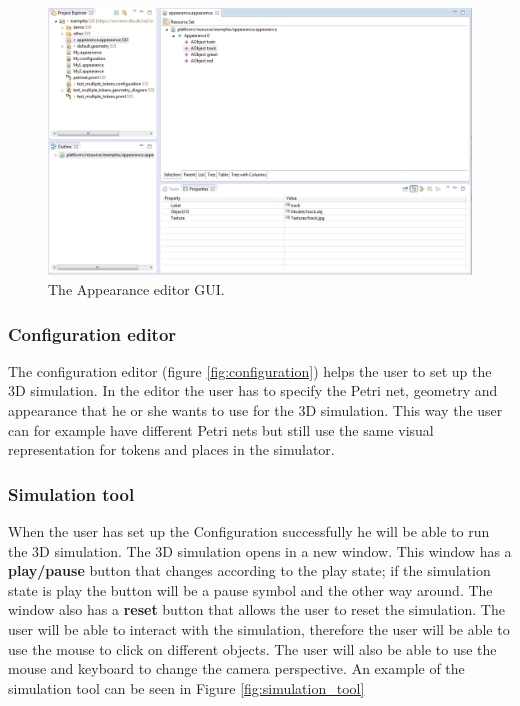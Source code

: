 \begin{figure}[ht]
\begin{center}
\includegraphics[scale=0.45]{image/ui/appearance.png}
\caption{The Appearance editor GUI.}
\label{fig:appearance_editor}
\end{center}
\end{figure}

\subsubsection{Configuration editor}
The configuration editor (figure \ref{fig:configuration}) helps the user to set up the 3D simulation. In the editor the user has to specify the Petri net, geometry and appearance that he or she wants to use for the 3D simulation. This way the user can for example have different Petri nets but still use the same visual representation for tokens and places in the simulator.

\subsubsection{Simulation tool}
When the user has set up the Configuration successfully he will be able to run the 3D simulation. The 3D simulation opens in a new window. This window has a \textbf{play/pause} button that changes according to the play state; if the simulation state is play the button will be a pause symbol and the other way around. The window also has a \textbf{reset} button that allows the user to reset the simulation.
The user will be able to interact with the simulation, therefore the user will be able to use the mouse to click on different objects. The user will also be able to use the mouse and keyboard to change the camera perspective. An example of the simulation tool can be seen in Figure \ref{fig:simulation_tool}

